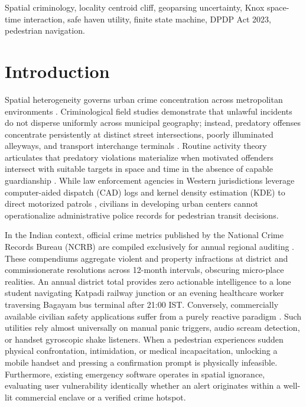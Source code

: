 \documentclass[conference]{IEEEtran}
\begin{document}
\begin{IEEEkeywords}
Spatial criminology, locality centroid cliff, geoparsing uncertainty, Knox space-time interaction, safe haven utility, finite state machine, DPDP Act 2023, pedestrian navigation.
\end{IEEEkeywords}

\section{Introduction}
Spatial heterogeneity governs urban crime concentration across metropolitan environments \cite{weisburd2015law, sherman1989hot}. Criminological field studies demonstrate that unlawful incidents do not disperse uniformly across municipal geography; instead, predatory offenses concentrate persistently at distinct street intersections, poorly illuminated alleyways, and transport interchange terminals \cite{sherman1989hot, brantingham1984patterns}. Routine activity theory articulates that predatory violations materialize when motivated offenders intersect with suitable targets in space and time in the absence of capable guardianship \cite{cohen1979social}. While law enforcement agencies in Western jurisdictions leverage computer-aided dispatch (CAD) logs and kernel density estimation (KDE) to direct motorized patrols \cite{chainey2008utility, braga2019hot}, civilians in developing urban centers cannot operationalize administrative police records for pedestrian transit decisions.

In the Indian context, official crime metrics published by the National Crime Records Bureau (NCRB) are compiled exclusively for annual regional auditing \cite{ncrb2022}. These compendiums aggregate violent and property infractions at district and commissionerate resolutions across 12-month intervals, obscuring micro-place realities. An annual district total provides zero actionable intelligence to a lone student navigating Katpadi railway junction or an evening healthcare worker traversing Bagayam bus terminal after 21:00 IST. Conversely, commercially available civilian safety applications suffer from a purely reactive paradigm \cite{chand2016wosapp}. Such utilities rely almost universally on manual panic triggers, audio scream detection, or handset gyroscopic shake listeners. When a pedestrian experiences sudden physical confrontation, intimidation, or medical incapacitation, unlocking a mobile handset and pressing a confirmation prompt is physically infeasible. Furthermore, existing emergency software operates in spatial ignorance, evaluating user vulnerability identically whether an alert originates within a well-lit commercial enclave or a verified crime hotspot.
\end{document}
